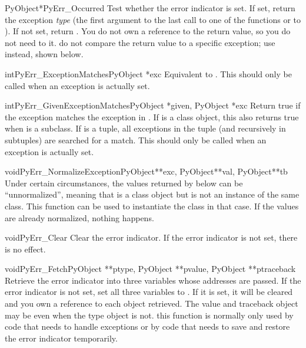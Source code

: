 \documentclass{manual}
\begin{document}
\begin{cfuncdesc}{PyObject*}{PyErr_Occurred}{}
Test whether the error indicator is set.  If set, return the exception
\emph{type} (the first argument to the last call to one of the
 functions or to ).  If
not set, return \NULL{}.  You do not own a reference to the return
value, so you do not need to  it.
 do not compare the return value to a specific
exception; use  instead, shown
below.
\end{cfuncdesc}

\begin{cfuncdesc}{int}{PyErr_ExceptionMatches}{PyObject *exc}
Equivalent to
.
This should only be called when an exception is actually set.
\end{cfuncdesc}

\begin{cfuncdesc}{int}{PyErr_GivenExceptionMatches}{PyObject *given, PyObject *exc}
Return true if the  exception matches the exception in
.  If  is a class object, this also returns true
when  is a subclass.  If  is a tuple, all
exceptions in the tuple (and recursively in subtuples) are searched
for a match.  This should only be called when an exception is actually
set.
\end{cfuncdesc}

\begin{cfuncdesc}{void}{PyErr_NormalizeException}{PyObject**exc, PyObject**val, PyObject**tb}
Under certain circumstances, the values returned by
 below can be ``unnormalized'', meaning that
 is a class object but  is not an
instance of the  same class.  This function can be used to instantiate
the class in that case.  If the values are already normalized, nothing
happens.
\end{cfuncdesc}

\begin{cfuncdesc}{void}{PyErr_Clear}{}
Clear the error indicator.  If the error indicator is not set, there
is no effect.
\end{cfuncdesc}

\begin{cfuncdesc}{void}{PyErr_Fetch}{PyObject **ptype, PyObject **pvalue, PyObject **ptraceback}
Retrieve the error indicator into three variables whose addresses are
passed.  If the error indicator is not set, set all three variables to
\NULL{}.  If it is set, it will be cleared and you own a reference to
each object retrieved.  The value and traceback object may be \NULL{}
even when the type object is not.   this function is
normally only used by code that needs to handle exceptions or by code
that needs to save and restore the error indicator temporarily.
\end{cfuncdesc}
\end{document}
